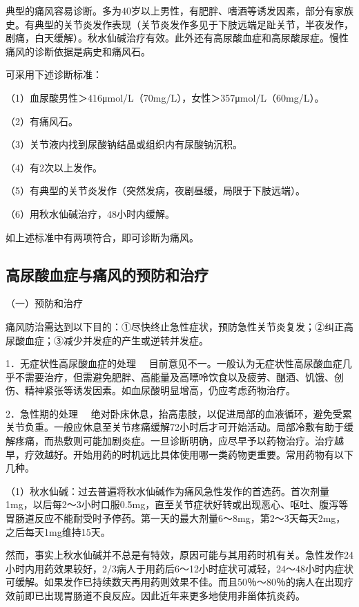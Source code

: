 典型的痛风容易诊断。多为40岁以上男性，有肥胖、嗜酒等诱发因素，部分有家族史。有典型的关节炎发作表现（关节炎发作多见于下肢远端足趾关节，半夜发作，剧痛，白天缓解）。秋水仙碱治疗有效。此外还有高尿酸血症和高尿酸尿症。慢性痛风的诊断依据是病史和痛风石。

可采用下述诊断标准：

（1）血尿酸男性＞416μmol/L（70mg/L），女性＞357μmol/L（60mg/L）。

（2）有痛风石。

（3）关节液内找到尿酸钠结晶或组织内有尿酸钠沉积。

（4）有2次以上发作。

（5）有典型的关节炎发作（突然发病，夜剧昼缓，局限于下肢远端）。

（6）用秋水仙碱治疗，48小时内缓解。

如上述标准中有两项符合，即可诊断为痛风。

\hypertarget{text00004.htmlux5cux23mllj27}{%
\subsection{高尿酸血症与痛风的预防和治疗}\label{text00004.htmlux5cux23mllj27}}

（一）预防和治疗

痛风防治需达到以下目的：①尽快终止急性症状，预防急性关节炎复发；②纠正高尿酸血症；③减少并发症的产生或逆转并发症。

{1．无症状性高尿酸血症的处理}
　目前意见不一。一般认为无症状性高尿酸血症几乎不需要治疗，但需避免肥胖、高能量及高嘌呤饮食以及疲劳、酗酒、饥饿、创伤、精神紧张等诱发因素。如血尿酸明显增高，仍应考虑药物治疗。

{2．急性期的处理}
　绝对卧床休息，抬高患肢，以促进局部的血液循环，避免受累关节负重。一般应休息至关节疼痛缓解72小时后才可开始活动。局部冷敷有助于缓解疼痛，而热敷则可能加剧炎症。一旦诊断明确，应尽早予以药物治疗。治疗越早，疗效越好。开始用药的时机远比具体使用哪一类药物更重要。常用药物有以下几种。

（1）秋水仙碱：过去普遍将秋水仙碱作为痛风急性发作的首选药。首次剂量1mg，以后每2～3小时口服0.5mg，直至关节症状好转或出现恶心、呕吐、腹泻等胃肠道反应不能耐受时予停药。第一天的最大剂量6～8mg，第2～3天每天2mg，之后每天1mg维持15天。

然而，事实上秋水仙碱并不总是有特效，原因可能与其用药时机有关。急性发作24小时内用药效果较好，2/3病人于用药后6～12小时症状可减轻，24～48小时内症状可缓解。如果发作已持续数天再用药则效果不佳。而且50％～80％的病人在出现疗效前即已出现胃肠道不良反应。因此近年来更多地使用非甾体抗炎药。


